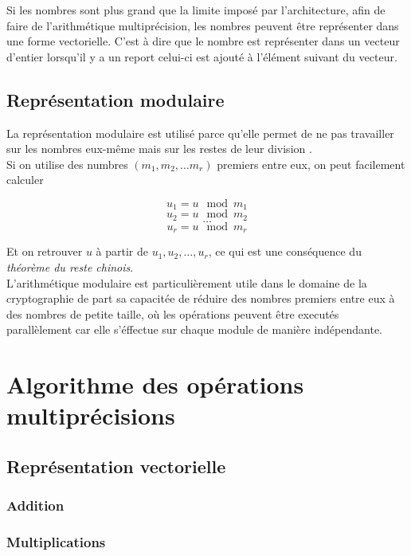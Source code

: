 \documentclass[letterpaper]{article}
\begin{document}
Si les nombres sont plus grand que la limite imposé par l'architecture, afin de
faire de l'arithmétique multiprécision, les nombres peuvent être représenter
dans une forme vectorielle. C'est à dire que le nombre est représenter dans un
vecteur d'entier lorsqu'il y a un report celui-ci est ajouté à l'élément
suivant du vecteur.


\subsection{Représentation modulaire}

La représentation modulaire est utilisé parce qu'elle permet de ne pas
travailler sur les nombres eux-même mais sur les restes de leur division
\cite{wikiamodulaire}.\\

Si on utilise des numbres $(m_1, m_2, \dots m_r)$ premiers entre eux,
on peut facilement calculer

  $$u_1 = u \mod m_1$$
  $$u_2 = u \mod m_2$$
  $$\dots$$
  $$u_r = u \mod m_r$$

Et on retrouver $u$ à partir de $u_1, u_2, \dots, u_r$, ce qui
est une conséquence du \emph{théorème du reste chinois}.\\

L'arithmétique modulaire est particulièrement utile dans le domaine de la
cryptographie de part sa capacitée de réduire des nombres premiers entre eux à
des nombres de petite taille, où les opérations peuvent être executés
parallèlement car elle s'éffectue sur chaque module de manière indépendante.

\section{Algorithme des opérations multiprécisions}

\subsection{Représentation vectorielle}

\subsubsection{Addition}

\subsubsection{Multiplications}
\end{document}
